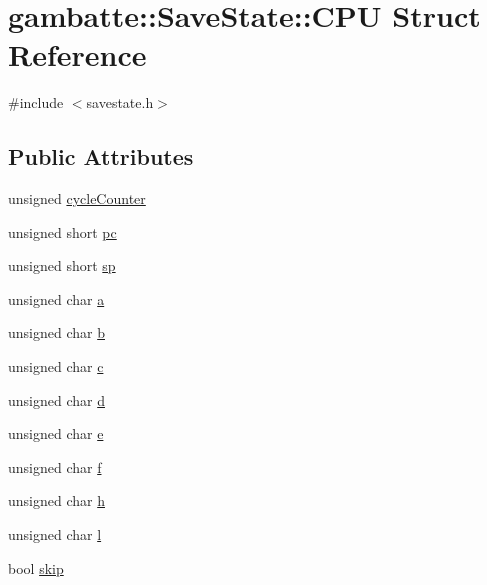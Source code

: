 \hypertarget{structgambatte_1_1SaveState_1_1CPU}{}\section{gambatte\+:\+:Save\+State\+:\+:C\+PU Struct Reference}
\label{structgambatte_1_1SaveState_1_1CPU}


{\ttfamily \#include $<$savestate.\+h$>$}

\subsection*{Public Attributes}
\begin{DoxyCompactItemize}
\item 
unsigned \hyperlink{structgambatte_1_1SaveState_1_1CPU_ae90b1140ae3783f2a2f231392cc69252}{cycle\+Counter}
\item 
unsigned short \hyperlink{structgambatte_1_1SaveState_1_1CPU_af7aecc14631c530186955584cd335862}{pc}
\item 
unsigned short \hyperlink{structgambatte_1_1SaveState_1_1CPU_a6f044fbd101e0bfa5e8762f134897c4b}{sp}
\item 
unsigned char \hyperlink{structgambatte_1_1SaveState_1_1CPU_abdaf265b0edd02408180873a8f3b386c}{a}
\item 
unsigned char \hyperlink{structgambatte_1_1SaveState_1_1CPU_a79056f7d29fe5033059c4fe4b03a6392}{b}
\item 
unsigned char \hyperlink{structgambatte_1_1SaveState_1_1CPU_a8ca2a8ea344927ecb73f3afddd1b28fd}{c}
\item 
unsigned char \hyperlink{structgambatte_1_1SaveState_1_1CPU_a220b57e70d3c110e0157985ce5a77d5d}{d}
\item 
unsigned char \hyperlink{structgambatte_1_1SaveState_1_1CPU_ac2df8c0e7e1f487689a83c930c698416}{e}
\item 
unsigned char \hyperlink{structgambatte_1_1SaveState_1_1CPU_ab7f3b5513b72b3c21c0c98cef694f7c2}{f}
\item 
unsigned char \hyperlink{structgambatte_1_1SaveState_1_1CPU_ad2e3e9aa15bbf00ea6454066bf898f14}{h}
\item 
unsigned char \hyperlink{structgambatte_1_1SaveState_1_1CPU_a1be44c38f3b0a4440fba7b1e9e3240a3}{l}
\item 
bool \hyperlink{structgambatte_1_1SaveState_1_1CPU_abc5cc42019adeb561c76c4ef69787c8f}{skip}
\end{DoxyCompactItemize}


